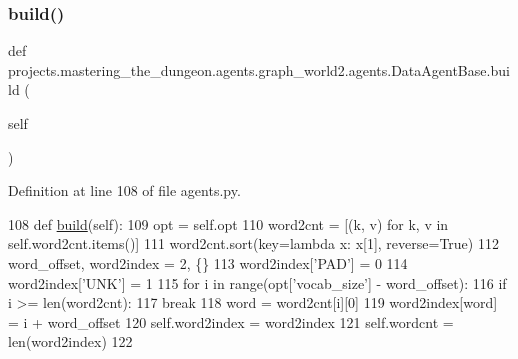 \subsubsection{\texorpdfstring{build()}{build()}}
{\footnotesize\ttfamily def projects.\+mastering\+\_\+the\+\_\+dungeon.\+agents.\+graph\+\_\+world2.\+agents.\+Data\+Agent\+Base.\+build (\begin{DoxyParamCaption}\item[{}]{self }\end{DoxyParamCaption})}



Definition at line 108 of file agents.\+py.


\begin{DoxyCode}
108     \textcolor{keyword}{def }\hyperlink{namespaceparlai_1_1mturk_1_1tasks_1_1talkthewalk_1_1download_a8c0fbb9b6dfe127cb8c1bd6e7c4e33fd}{build}(self):
109         opt = self.opt
110         word2cnt = [(k, v) \textcolor{keywordflow}{for} k, v \textcolor{keywordflow}{in} self.word2cnt.items()]
111         word2cnt.sort(key=\textcolor{keyword}{lambda} x: x[1], reverse=\textcolor{keyword}{True})
112         word\_offset, word2index = 2, \{\}
113         word2index[\textcolor{stringliteral}{'PAD'}] = 0
114         word2index[\textcolor{stringliteral}{'UNK'}] = 1
115         \textcolor{keywordflow}{for} i \textcolor{keywordflow}{in} range(opt[\textcolor{stringliteral}{'vocab\_size'}] - word\_offset):
116             \textcolor{keywordflow}{if} i >= len(word2cnt):
117                 \textcolor{keywordflow}{break}
118             word = word2cnt[i][0]
119             word2index[word] = i + word\_offset
120         self.word2index = word2index
121         self.wordcnt = len(word2index)
122 
\end{DoxyCode}
\mbox{\label{classprojects_1_1mastering__the__dungeon_1_1agents_1_1graph__world2_1_1agents_1_1DataAgentBase_a830ec93c967867b414ec3ca4d0e66879}} 
